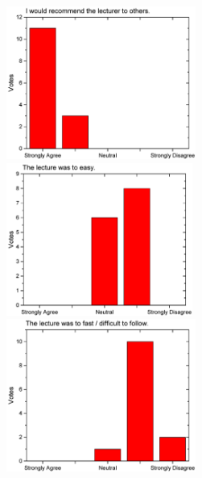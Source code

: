 \begin{figure}[h!]
\begin{minipage}{.48\linewidth}
    \centering
      {\includegraphics[height=50mm]{figures/n/Graph74.pdf}}
      {\includegraphics[height=50mm]{figures/n/Graph75.pdf}}
      {\includegraphics[height=50mm]{figures/n/Graph76.pdf}}
  \end{minipage}
\end{figure}

